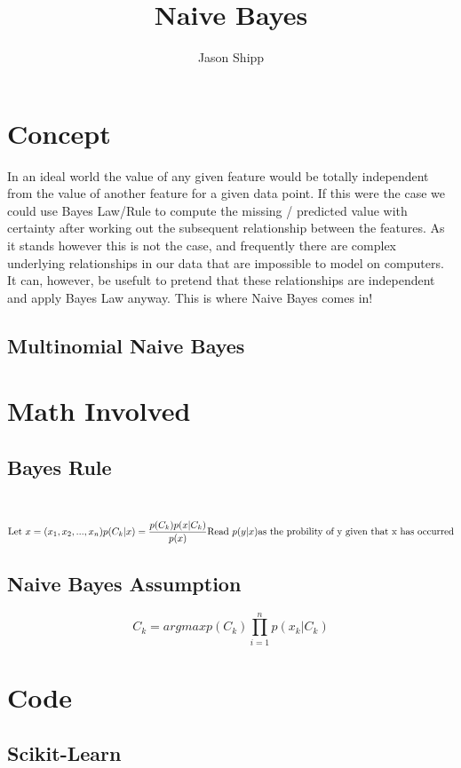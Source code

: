 \documentclass{article}
\begin{document}
\title{Naive Bayes}
\author{Jason Shipp}
\maketitle

\section*{Concept}
In an ideal world the value of any given feature would be totally independent
from the value of another feature for a given data point. If this were the case
we could use Bayes Law/Rule to compute the missing / predicted value with
certainty after working out the subsequent relationship between the features. As
it stands however this is not the case, and frequently there are complex
underlying relationships in our data that are impossible to model on computers.
It can, however, be usefult to pretend that these relationships are independent
and apply Bayes Law anyway. This is where Naive Bayes comes in! 

\subsection*{Multinomial Naive Bayes}


\section*{Math Involved}

\subsection*{Bayes Rule} \\
\begin{equation}
  \text{Let } x = (x_1, x_2, ..., x_n) \\
  p(C_k | x) = \frac{p(C_k)p(x | C_k)}{p(x)}\\
  \text{Read } p(y|x) \text{as the probility of y given that x has occurred}
\end{equation}

\subsection*{Naive Bayes Assumption}
\begin{equation}
  C_k = argmax p(C_k)\prod_{i=1}^{n}p(x_k | C_k)
\end{equation}

\section*{Code}
\subsection*{Scikit-Learn}
 
\end{document}
